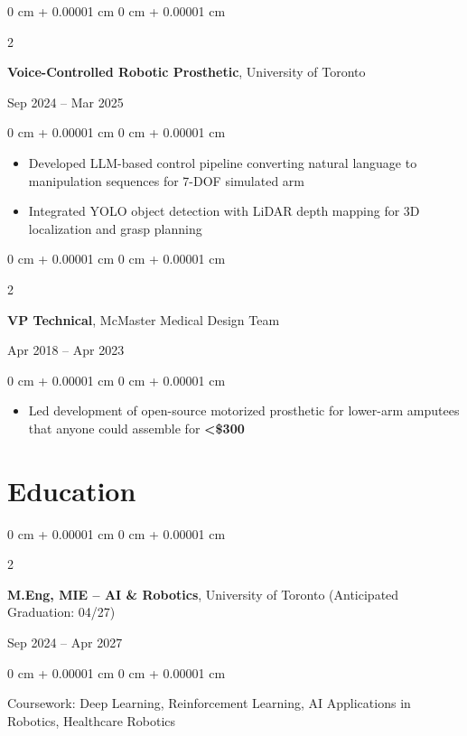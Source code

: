 \documentclass[10pt, letterpaper]{article}
\newenvironment{highlights}{
    \begin{itemize}[
        topsep=0.10 cm,
        parsep=0.10 cm,
        partopsep=0pt,
        itemsep=0pt,
        leftmargin=0 cm + 10pt
    ]
}{
    \end{itemize}
} %
\newenvironment{onecolentry}{
    \begin{adjustwidth}{
        0 cm + 0.00001 cm
    }{
        0 cm + 0.00001 cm
    }
}{
    \end{adjustwidth}
} %
\newenvironment{twocolentry}[2][]{
    \onecolentry
    \def\secondColumn{#2}
    \setcolumnwidth{\fill, 4.5 cm}
    \begin{paracol}{2}
}{
    \switchcolumn \raggedleft \secondColumn
    \end{paracol}
    \endonecolentry
} %
\begin{document}
    \vspace{0.2 cm}
    \begin{twocolentry}{Sep 2024 – Mar 2025}
        \textbf{Voice-Controlled Robotic Prosthetic}, University of Toronto
    \end{twocolentry}
    \vspace{0.10 cm}
    \begin{onecolentry}
        \begin{highlights}
            \item Developed LLM-based control pipeline converting natural language to manipulation sequences for 7-DOF simulated arm
            \item Integrated YOLO object detection with LiDAR depth mapping for 3D localization and grasp planning
        \end{highlights}
    \end{onecolentry}

    \vspace{0.2 cm}
    \begin{twocolentry}{Apr 2018 – Apr 2023}
        \textbf{VP Technical}, McMaster Medical Design Team
    \end{twocolentry}
    \vspace{0.10 cm}
    \begin{onecolentry}
        \begin{highlights}
            \item Led development of open-source motorized prosthetic for lower-arm amputees that anyone could assemble for \textbf{<\$300}
        \end{highlights}
    \end{onecolentry}

\section{Education}
    \begin{twocolentry}{Sep 2024 – Apr 2027}
        \textbf{M.Eng, MIE -- AI \& Robotics}, University of Toronto (Anticipated Graduation: 04/27)
    \end{twocolentry}
    \vspace{0.08 cm}
    \begin{onecolentry}
        Coursework: Deep Learning, Reinforcement Learning, AI Applications in Robotics, Healthcare Robotics
    \end{onecolentry}
\end{document}
